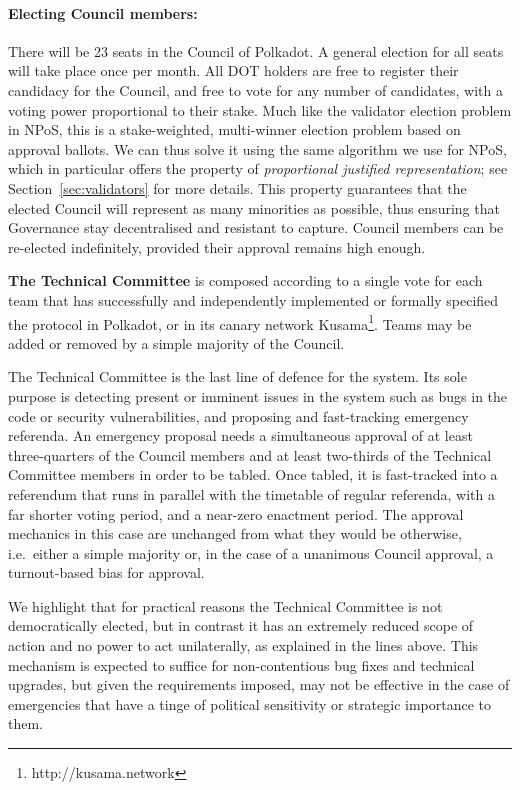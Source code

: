 \documentclass{article}
\begin{document}
\paragraph{Electing Council members:} There will be 23 seats in the Council of Polkadot. A general election for all seats will take place once per month. 
All DOT holders are free to register their candidacy for the Council, and free to vote for any number of candidates, with a voting power proportional to their stake. Much like the validator election problem in NPoS, this is a stake-weighted, multi-winner election problem based on approval ballots. We can thus solve it using the same algorithm we use for NPoS, which in particular offers the property of \emph{proportional justified representation}; see Section~\ref{sec:validators} for more details. This property guarantees that the elected Council will represent as many minorities as possible, thus ensuring that Governance stay decentralised and resistant to capture. Council members can be re-elected indefinitely, provided their approval remains high enough. 

\medskip

\textbf{The Technical Committee} is composed according to a single vote for each team that has successfully and independently implemented or formally specified the protocol in Polkadot, or in its canary network Kusama\footnote{http://kusama.network}. Teams may be added or removed by a simple majority of the Council. 

The Technical Committee is the last line of defence for the system. Its sole purpose is detecting present or imminent issues in the system such as bugs in the code or security vulnerabilities, and proposing and fast-tracking emergency referenda. An emergency proposal needs a simultaneous approval of at least three-quarters of the Council members and at least two-thirds of the Technical Committee members in order to be tabled. Once tabled, it is fast-tracked into a referendum that runs in parallel with the timetable of regular referenda, with a far shorter voting period, and a near-zero enactment period. The approval mechanics in this case are unchanged from what they would be otherwise, i.e.~either a simple majority or, in the case of a unanimous Council approval, a turnout-based bias for approval.

We highlight that for practical reasons the Technical Committee is not democratically elected, but in contrast it has an extremely reduced scope of action and no power to act unilaterally, as explained in the lines above. This mechanism is expected to suffice for non-contentious bug fixes and technical upgrades, but given the requirements imposed, may not be effective in the case of emergencies that have a tinge of political sensitivity or strategic importance to them. 
\end{document}
